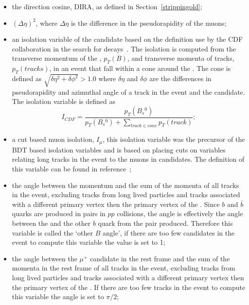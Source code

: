 \begin{itemize}
\item the direction cosine, DIRA, as defined in Section~\ref{strippingold};
\item $(\Delta \eta)^{2}$, where $\Delta \eta$ is the difference in the pseudorapidity of the muons;
\item an isolation variable of the \bs candidate based on the definition use by the CDF collaboration in the search for \bmumu decays~\cite{Abulencia:2005pw}. The isolation is computed from the transverse momentum of the \bs, $p_{T}(B)$, and transverse momenta of tracks, $p_{T}(tracks)$, in an event that fall within a cone around the \bs. The cone is defined as $\sqrt{\delta \eta^{2} + \delta \phi^{2}} > 1.0$ where $\delta \eta$ and $\delta \phi$ are the differences in pseudorapidity and azimuthal angle of a track in the event and the \bs candidate. The isolation variable is defined as 
\begin{equation}
I_{CDF} = \frac{p_{T}(B_{s}{^0})}{p_{T}(B_{s}{^0}) + \displaystyle\sum_{track \in cone}p_{T}(track) };
\end{equation}
\item a cut based muon isolation, $I_{\mu}$, this isolation variable was the precursor of the BDT based isolation variables and is based on placing cuts on variables relating long tracks in the event to the muons in \bsmumu candidates. The definition of this variable can be found in reference~\~\cite{Morda:2120795};
\item the angle between the \bs momentum and the sum of the momenta of all tracks in the event, excluding tracks from long lived particles and tracks associated with a different primary vertex then the primary vertex of the \bs. Since $b$ and $\bar{b}$ quarks are produced in pairs in $pp$ collisions, the angle is effectively the angle between the \bs and the other $b$ quark from the pair produced. Therefore this variable is called the `other $B$ angle', if there are too few candidates in the event to compute this variable the value is set to 1; %
\item the angle between the $\mu^+$ candidate in the \bs rest frame and the sum of the momenta in the \bs rest frame of all tracks in the event, excluding tracks from long lived particles and tracks associated with a different primary vertex then the primary vertex of the \bs. If there are too few tracks in the event to compute this variable the angle is set to $\pi/2$;%

\end{itemize}
